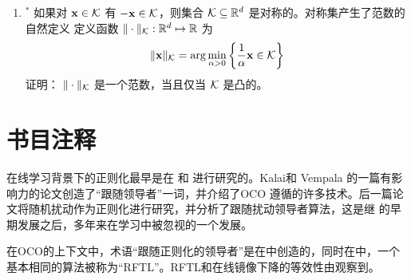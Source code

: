 \begin{enumerate}
	 \item $^*$   
	 如果对 $\mathbf x \in \mathcal K$ 有 $-\mathbf x \in \mathcal K$，则集合 $\mathcal K \subseteq {\mathbb R}^d$ 是对称的。对称集产生了范数的自然定义
	 定义函数 $\| \cdot \|_{\mathcal K} : {\mathbb R}^d \mapsto {\mathbb R}$ 为
	 $$ \| \mathbf x \|_{\mathcal K} = \arg \min_{\alpha > 0 }  \left \{ \frac{1}{\alpha} \mathbf x \in \mathcal K \right \} $$ 
	 证明： $\| \cdot \|_{\mathcal K}$ 是一个范数，当且仅当 $\mathcal K$ 是凸的。
\end{enumerate}









\newpage
\section{
	书目注释
	}


在线学习背景下的正则化最早是在\cite{GroveLS01} 和 \cite{KivinenW01}进行研究的。Kalai和 Vempala \cite{KV-FTL}的一篇有影响力的论文创造了“跟随领导者”一词，并介绍了OCO 遵循的许多技术。后一篇论文将随机扰动作为正则化进行研究，并分析了跟随扰动领导者算法，这是继 \cite{Hannan57}的早期发展之后，多年来在学习中被忽视的一个发展。


在OCO的上下文中，术语“跟随正则化的领导者”是在\cite{ShwartzS07,ShalevThesis}中创造的，同时在\cite{AbernethyHR08}中，一个基本相同的算法被称为“RFTL”。RFTL和在线镜像下降的等效性由\cite{DBLP:conf/colt/HazanK08}观察到。